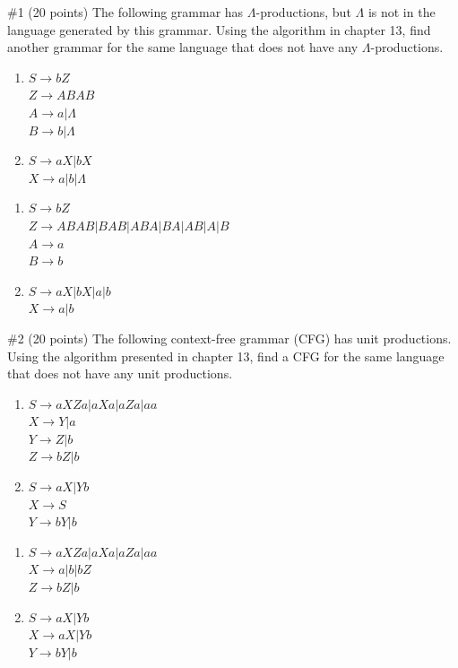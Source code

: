 \begin{problem}{\#1 (20 points)}
    The following grammar has $\Lambda$-productions, but $\Lambda$ is not in the language generated by this grammar.
    Using the algorithm in chapter 13, find another grammar for the same language that does not have any $\Lambda$-productions.
    \begin{enumerate}[label=\alph*)]
        \item $S \to bZ$\\
        $Z \to ABAB$\\
        $A \to a | \Lambda$\\
        $B \to b | \Lambda$
        \item $S \to aX | bX$\\
        $X \to a | b | \Lambda$\\
    \end{enumerate}
\end{problem}
\begin{solution}
    \begin{enumerate}[label=\alph*)]
        \item $S \to bZ$\\
        $Z \to ABAB | BAB | ABA | BA | AB | A | B$\\
        $A \to a$\\
        $B \to b$
        \item $S \to aX | bX | a | b$\\
        $X \to a | b$
    \end{enumerate}
\end{solution}

\begin{problem}{\#2 (20 points)}
    The following context-free grammar (CFG) has unit productions.
    Using the algorithm presented in chapter 13, find a CFG for the same language that does not have any unit productions.
    \begin{enumerate}[label=\alph*)]
        \item $S \to aXZa | aXa | aZa | aa$\\
        $X \to Y | a$\\
        $Y \to Z | b$\\
        $Z \to bZ | b$
        \item $S \to aX | Yb$\\
        $X \to S$\\
        $Y \to bY | b$
    \end{enumerate}
\end{problem}
\begin{solution}
    \begin{enumerate}[label =\alph*)]
        \item $S \to aXZa | aXa | aZa | aa$\\
        $X \to a | b | bZ$\\
        $Z \to bZ | b$
        \item $S \to aX | Yb$\\
        $X \to aX | Yb$\\
        $Y \to bY | b$
    \end{enumerate}
\end{solution}


